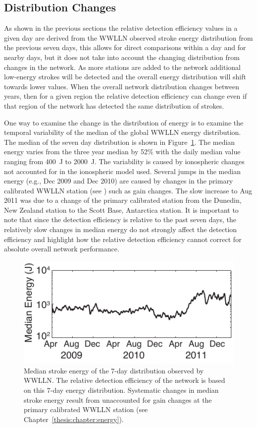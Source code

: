 \subsection{Distribution Changes}

As shown in the previous sections the relative detection efficiency values in a given day are derived from the WWLLN observed stroke energy distribution from the previous seven days, this allows for direct comparisons within a day and for nearby days, but it does not take into account the changing distribution from changes in the network.
As more stations are added to the network additional low-energy strokes will be detected and the overall energy distribution will shift towards lower values.
When the overall network distribution changes between years, then for a given region the relative detection efficiency can change even if that region of the network has detected the same distribution of strokes.

One way to examine the change in the distribution of energy is to examine the temporal variability of the median of the global WWLLN energy distribution.
The median of the seven day distribution is shown in Figure~\ref{efficiency:fig:MedianEnergy}.
The median energy varies from the three year median by 52\% with the daily median value ranging from 400~J to 2000~J.
The variability is caused by ionospheric changes not accounted for in the ionospheric model used.
Several jumps in the median energy (e.g., Dec 2009 and Dec 2010) are caused by changes in the primary calibrated WWLLN station (see \citet{Hutchins2012}) such as gain changes.
The slow increase to Aug 2011 was due to a change of the primary calibrated station from the Dunedin, New Zealand station to the Scott Base, Antarctica station.
It is important to note that since the detection efficiency is relative to the past seven days, the relatively slow changes in median energy do not strongly affect the detection efficiency and highlight how the relative detection efficiency cannot correct for absolute overall network performance.

\begin{figure}[ht!]
   \centering
\noindent\includegraphics[scale=1]{efficiency/Figures/2012RS005049-f8.pdf}
   \caption{Median stroke energy of the 7-day distribution observed by WWLLN.
The relative detection efficiency of the network is based on this 7-day energy distribution.
   Systematic changes in median stroke energy result from unaccounted for gain changes at the primary calibrated WWLLN station (see Chapter~\ref{thesis:chapter:energy}).}
   \label{efficiency:fig:MedianEnergy}
\end{figure}

